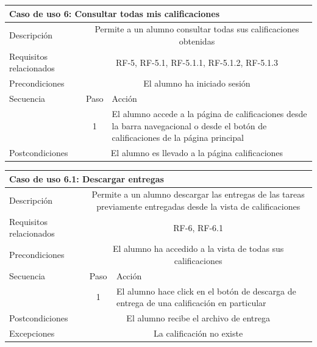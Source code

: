 \hspace{3cm} 

\begin{adjustwidth}{-2cm}{}
\begin{tabular}[H]{l c l}
\toprule 
\multicolumn{3}{l}{\textbf{Caso de uso 6: Consultar todas mis calificaciones}}\\
\midrule
Descripción & \multicolumn{2}{p{10cm}}{Permite a un alumno consultar todas sus calificaciones obtenidas}\\
\midrule
Requisitos relacionados & \multicolumn{2}{p{10cm}}{RF-5, RF-5.1, RF-5.1.1, RF-5.1.2, RF-5.1.3}\\
\midrule
Precondiciones & \multicolumn{2}{p{10cm}}{El alumno ha iniciado sesión}\\
\midrule
Secuencia & Paso & Acción \\
\cmidrule{2-3}
         & 1 & \multicolumn{1}{p{8cm}}{El alumno accede a la página de calificaciones desde la barra navegacional o desde el botón de calificaciones de la página principal} \\
\midrule
Postcondiciones & \multicolumn{2}{p{10cm}}{El alumno es llevado a la página calificaciones}\\
\bottomrule 
\end{tabular}



\hspace{3cm}

\begin{tabular}[H]{l c l}
\toprule 
\multicolumn{3}{l}{\textbf{Caso de uso 6.1: Descargar entregas}}\\
\midrule
Descripción & \multicolumn{2}{p{10cm}}{Permite a un alumno descargar las entregas de las tareas previamente entregadas desde la vista de calificaciones}\\
\midrule
Requisitos relacionados & \multicolumn{2}{p{10cm}}{RF-6, RF-6.1}\\
\midrule
Precondiciones & \multicolumn{2}{p{10cm}}{El alumno ha accedido a la vista de todas sus calificaciones}\\
\midrule
Secuencia & Paso & Acción \\
\cmidrule{2-3}
         & 1 &  \multicolumn{1}{p{8cm}}{El alumno hace click en el botón de descarga de entrega de una calificación en particular}\\
         
\midrule
Postcondiciones & \multicolumn{2}{p{10cm}}{El alumno recibe el archivo de entrega}\\
\midrule
Excepciones  & \multicolumn{2}{p{10cm}}{La calificación no existe}\\
\bottomrule 
\end{tabular}
\end{adjustwidth}


